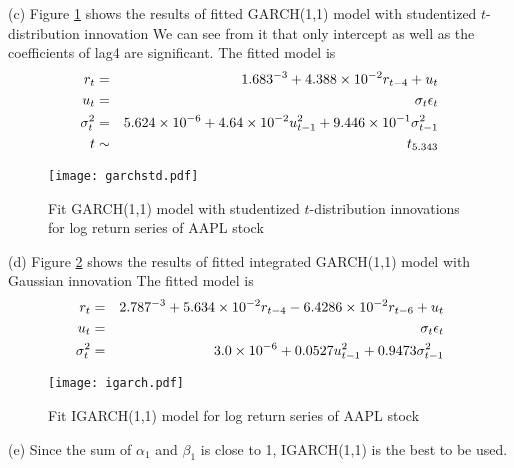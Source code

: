\documentclass[11pt]{article}
\begin{document}
(c)
Figure \ref{garchstd} shows the results of fitted GARCH(1,1) model with studentized $t$-distribution innovation We can see from it that only intercept as well as the coefficients of lag4 are significant. The fitted model is
\begin{eqnarray*}
r_t&=& 1.683\time10^{-3}+4.388\times10^{-2}r_{t-4}+u_t\\
u_t&=&\sigma_t\epsilon_t\\
\sigma^2_t&=&5.624\times 10^{-6}+4.64\times10^{-2}u^2_{t-1}+9.446\times10^{-1}\sigma^2_{t-1}\\
t&\sim&t_{5.343}
\end{eqnarray*}
\begin{figure}[htb]
\centering
\texttt{[image: garchstd.pdf]}
\caption{Fit GARCH(1,1) model with studentized $t$-distribution innovations for log return series of AAPL stock  }
\label{garchstd}
\end{figure}

(d)
Figure \ref{igarch} shows the results of fitted integrated GARCH(1,1) model with Gaussian innovation  The fitted model is
\begin{eqnarray*}
r_t&=& 2.787\time10^{-3}+5.634\times10^{-2}r_{t-4}-6.4286\times10^{-2}r_{t-6}+u_t\\
u_t&=&\sigma_t\epsilon_t\\
\sigma^2_t&=&3.0\times 10^{-6}+0.0527u^2_{t-1}+0.9473\sigma^2_{t-1}
\end{eqnarray*}

\begin{figure}[htb]
\centering
\texttt{[image: igarch.pdf]}
\caption{Fit IGARCH(1,1) model for log return series of AAPL stock  }
\label{igarch}
\end{figure}
(e)
 Since the sum of $\alpha_1$ and $\beta_1$ is close to 1, IGARCH(1,1) is the best to be used.
\end{document}
